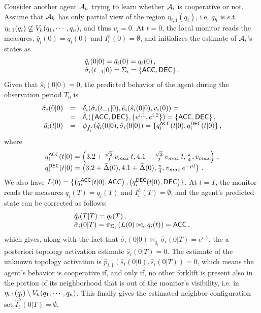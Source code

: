 \documentclass[journal, onecolumn, 12pt]{styles/IEEEtran}
\begin{document}
Consider another agent $\mathcal{A}_h$ trying to learn whether $\mathcal{A}_i$ is cooperative or not. Assume that $\mathcal{A}_h$ has only partial view of the region $\eta_{i,1}(q_i)$, i.e. $q_h$ is s.t. $\eta_{i,1}(q_i) \not\subseteq V_h(q_1, \cdots, q_n)$, and thus $v_i = 0$. At $t=0$, the local monitor reads the measures, $\bar{q}_i(0) = q_i(0)$ and $I_i^h(0) = \emptyset$, and initializes the estimate of $\mathcal{A}_i$'s states as
$$
\begin{array}{l}
\hat{q}_i(0|0) = \bar{q}_i(0) = q_i(0) \, , \\
\hat{\sigma}_i(t_{-1}|0) = \Sigma_i = \{\macc, \mdec\} \, . \\
\end{array}
$$
Given that $\hat{s}_i(0|0) = 0$, the predicted behavior of the agent during the observation period $T_0$ is
$$
\begin{array}{rcl}
\hat{\sigma}_i(0|0) & = & \tilde{\delta}_i(\hat{\sigma}_i(t_{-1}|0), \tilde{e}_i(\hat{s}_i(0|0), v_i(0)) = \\
& = & \tilde{\delta}_i(\{\macc, \mdec\}, \{e^{i,1}, e^{i,2}\}) = \{\macc, \mdec\} \, ,\\
\hat{q}_i(t|0) & = & \phi_{\tilde{f}_i^*}(\hat{q}_i(0|0), \hat{\sigma}_i(0|0)) = \{ q_i^{\macc}(t|0), q_i^{\mdec}(t|0) \} \, , 
\end{array}
$$
where 
$$
\begin{array}{l}
q_i^{\macc}(t|0) = \left(3.2 + \frac{\sqrt{2}}{2} \, v_{max} \, t,  4.1 + \frac{\sqrt{2}}{2} \, v_{max} \, t, \frac{\pi}{4}, v_{max} \right) \, , \\
q_i^{\mdec}(t|0) = \left(3.2 + \bar\Delta(0),  4.1 + \bar\Delta(0), \frac{\pi}{4}, v_{max} \, e^{-\mu t} \right) \, . 
\end{array}
$$
We also have $L(0) = \{\left( q_i^{\macc}(t|0), \macc \right), \left( q_i^{\mdec}(t|0), \mdec \right) \}$. At $t=T$, the monitor reads the measures $\bar{q}_i(T) = q_i(T)$ and $I_i^h(T) = \emptyset$, and the agent's predicted state can be corrected as follows:
$$
\begin{array}{l}
\hat{q}_i(T|T) = \bar{q}_i(T) \, , \\
\hat{\sigma}_i(0|T) = \pi_{\Sigma_i} \left( L(0) \bowtie_\epsilon q_i(t) \right) = \macc \, ,
\end{array}
$$
which gives, along with the fact that $\hat{\sigma}_i(0|0) \bowtie_{\tilde{\delta}_i} \hat{\sigma}_i(0|T) = e^{i,1}$, the a posteriori topology activation estimate $\hat{s}_i(0|T) = 0$. The estimate of the unknown topology activation is $\hat{p}_{i,1}(\hat{s}_i(0|0), \hat{s}_i(0|T))=0$, which means the agent's behavior is cooperative if, and only if, no other forklift is present also in the portion of its neighborhood that is out of the monitor's visibility, i.e. in $\eta_{i,1}(q_i) \setminus V_h(q_1, \cdots, q_n)$. This finally gives the estimated neighbor configuration set $\hat{I}_i^h(0|T) = \emptyset$.
\end{document}
